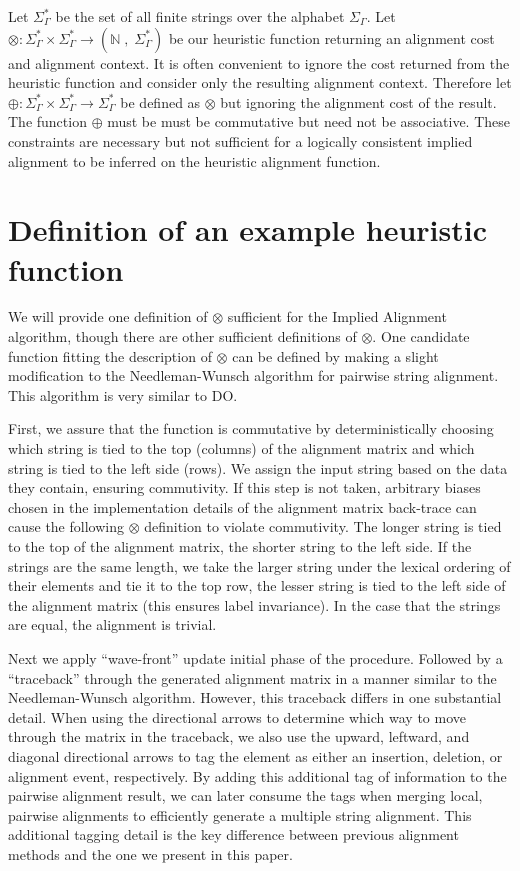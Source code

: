 \documentclass[11pt]{article}
\begin{document}
Let $\Sigma^{*}_{\Gamma}$ be the set of all finite strings over the alphabet $\Sigma_{\Gamma}$.
Let $\otimes : \Sigma^{*}_{\Gamma} \times \Sigma^{*}_{\Gamma} \rightarrow \left(\mathbb{N}\;,\; \Sigma^{*}_{\Gamma}\right)$ be our heuristic function returning an alignment cost and alignment context.
It is often convenient to ignore the cost returned from the heuristic function and consider only the resulting alignment context.
Therefore let $\oplus : \Sigma^{*}_{\Gamma} \times \Sigma^{*}_{\Gamma} \rightarrow \Sigma^{*}_{\Gamma}$ be defined as $\otimes$ but ignoring the alignment cost of the result.
The function $\oplus$ must be must be commutative but need not be associative.
These constraints are necessary but not sufficient for a logically consistent implied alignment to be inferred on the heuristic alignment function.

\section{Definition of an example heuristic function}
We will provide one definition of $\otimes$ sufficient for the Implied Alignment algorithm, though there are other sufficient definitions of $\otimes$.
One candidate function fitting the description of $\otimes$ can be defined by making a slight modification to the Needleman-Wunsch \citep{Needleman1970} algorithm for pairwise string alignment.
This algorithm is very similar to DO.

First, we assure that the function is commutative by deterministically choosing which string is tied to the top (columns) of the alignment matrix and which string is tied to the left side (rows).
We assign the input string based on the data they contain, ensuring commutivity.
If this step is not taken, arbitrary biases chosen in the implementation details of the alignment matrix back-trace can cause the following $\otimes$ definition to violate commutivity.
The longer string is tied to the top of the alignment matrix, the shorter string to the left side.
If the strings are the same length, we take the larger string under the lexical ordering of their elements and tie it to the top row, the lesser string is tied to the left side of the alignment matrix (this ensures label invariance). 
In the case that the strings are equal, the alignment is trivial.

Next we apply ``wave-front'' update initial phase of the procedure.
Followed by a ``traceback'' through the generated alignment matrix in a manner similar to the Needleman-Wunsch algorithm.
However, this traceback differs in one substantial detail.
When using the directional arrows to determine which way to move through the matrix in the traceback, we also use the upward, leftward, and diagonal directional arrows to tag the element as either an insertion, deletion, or alignment event, respectively. 
By adding this additional tag of information to the pairwise alignment result, we can later consume the tags when merging local, pairwise alignments to efficiently generate a multiple string alignment.
This additional tagging detail is the key difference between previous alignment methods and the one we present in this paper.
\end{document}
